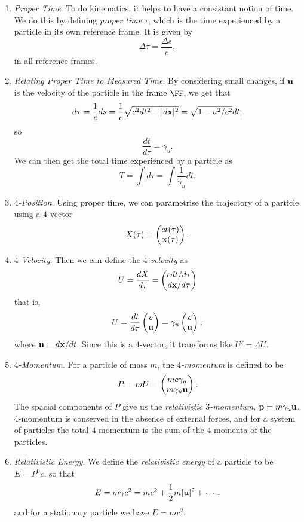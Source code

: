 \documentclass[a4paper]{scrartcl}
\begin{document}
\begin{enumerate}
	\item \emph{Proper Time}. To do kinematics, it helps to have a consistant notion of time. We do this by defining \emph{proper time} $\tau$, which is the time experienced by a particle in its own reference frame. It is given by
	$$
	\Delta \tau = \frac{\Delta s}{c},
	$$
	in all reference frames.
	\item \emph{Relating Proper Time to Measured Time}. By considering small changes, if $\mathbf{u}$ is the velocity of the particle in the frame $\FF$, we get that
	$$
	d \tau = \frac{1}{c} d s = \frac{1}{c} \sqrt{c^2 d t^2 - |d\mathbf{x}|^2} = \sqrt{1 - u^2/c^2} d t,
	$$
	so
	$$ \frac{dt}{d \tau} = \gamma_u.
$$
We can then get the total time experienced by a particle as
$$
T = \int d \tau = \int \frac{1}{\gamma_u} d t.
$$
\item \emph{$4$-Position}. Using proper time, we can parametrise the trajectory of a particle using a $4$-vector
$$
X(\tau) = \begin{pmatrix}
	ct(\tau) \\
	\mathbf{x}(\tau)
\end{pmatrix}.
$$
\item \emph{$4$-Velocity}. Then we can define the \emph{$4$-velocity} as
$$
U = \frac{dX}{d \tau} = \begin{pmatrix}
	c dt/d\tau \\
	d \mathbf{x} / d \tau
\end{pmatrix}
$$
that is,
$$  U = \frac{dt}{d\tau} \begin{pmatrix}
	c \\ \mathbf{u}
\end{pmatrix} = \gamma_u \begin{pmatrix}
	c \\ \mathbf{u}
\end{pmatrix},
$$
where $\mathbf{u} = d \mathbf{x}/ dt$. Since this is a $4$-vector, it transforms like $U' = \Lambda U$. 
\item \emph{$4$-Momentum}. For a particle of mass $m$, the \emph{$4$-momentum} is defined to be
$$
P = mU = \begin{pmatrix}
	mc \gamma_u \\
	m \gamma_u \mathbf{u}
\end{pmatrix}.
$$
The spacial components of $P$ give us the \emph{relativistic $3$-momentum}, $\mathbf{p} = m \gamma_u \mathbf{u}$. $4$-momentum is conserved in the absence of external forces, and for a system of particles the total $4$-momentum is the sum of the $4$-momenta of the particles.
\item \emph{Relativistic Energy}. We define the \emph{relativistic energy} of a particle to be $E = P^0 c$, so that
$$
E = m \gamma c^2 = mc^2 + \frac{1}{2} m |\mathbf{u}|^2 + \cdots,
$$
and for a stationary particle we have $E = mc^2$. 


\end{enumerate}
\end{document}
